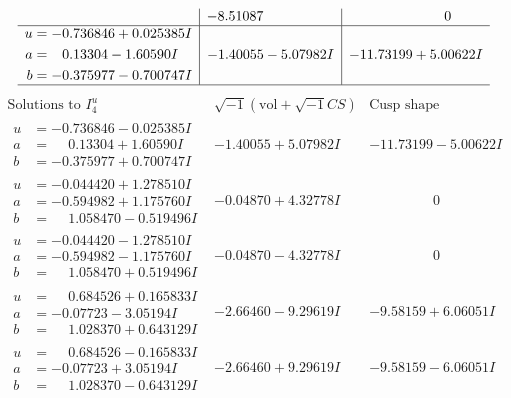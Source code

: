 \documentclass[1p]{elsarticle_modified}
\theoremstyle{definition}
\newcommand{\I}{\sqrt{-1}}
\begin{document}
$$\begin{array}{c|c|c}
 & -8.51087\phantom{ +0.000000I} & \phantom{-0.000000 } 0 \\ \hline\begin{aligned}
u &= -0.736846 + 0.025385 I \\
a &= \phantom{-}0.13304 - 1.60590 I \\
b &= -0.375977 - 0.700747 I\end{aligned}
 & -1.40055 - 5.07982 I & -11.73199 + 5.00622 I\\
 \hline 
 \end{array}$$\newpage$$\begin{array}{c|c|c}  
\text{Solutions to }I^u_{4}& \I (\text{vol} + \sqrt{-1}CS) & \text{Cusp shape}\\
 \hline 
\begin{aligned}
u &= -0.736846 - 0.025385 I \\
a &= \phantom{-}0.13304 + 1.60590 I \\
b &= -0.375977 + 0.700747 I\end{aligned}
 & -1.40055 + 5.07982 I & -11.73199 - 5.00622 I \\ \hline\begin{aligned}
u &= -0.044420 + 1.278510 I \\
a &= -0.594982 + 1.175760 I \\
b &= \phantom{-}1.058470 - 0.519496 I\end{aligned}
 & -0.04870 + 4.32778 I & \phantom{-0.000000 } 0 \\ \hline\begin{aligned}
u &= -0.044420 - 1.278510 I \\
a &= -0.594982 - 1.175760 I \\
b &= \phantom{-}1.058470 + 0.519496 I\end{aligned}
 & -0.04870 - 4.32778 I & \phantom{-0.000000 } 0 \\ \hline\begin{aligned}
u &= \phantom{-}0.684526 + 0.165833 I \\
a &= -0.07723 - 3.05194 I \\
b &= \phantom{-}1.028370 + 0.643129 I\end{aligned}
 & -2.66460 - 9.29619 I & -9.58159 + 6.06051 I \\ \hline\begin{aligned}
u &= \phantom{-}0.684526 - 0.165833 I \\
a &= -0.07723 + 3.05194 I \\
b &= \phantom{-}1.028370 - 0.643129 I\end{aligned}
 & -2.66460 + 9.29619 I & -9.58159 - 6.06051 I \\ \hline\begin{aligned}

\end{aligned}
\end{array}$$
\end{document}
